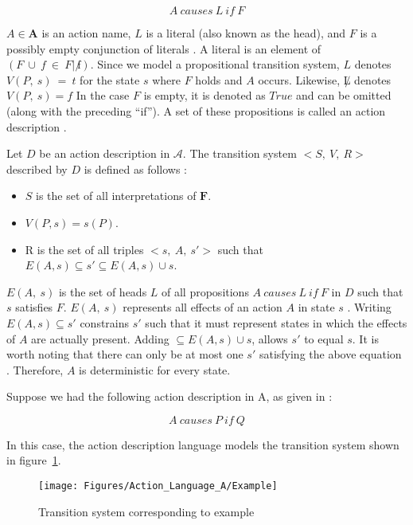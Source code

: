 $$
A\ causes\ L\ if\ F
$$

$ A \in \boldsymbol{A} $ is an action name, $ L $ is a literal (also known as the head), and $ F $ is a possibly empty conjunction of literals \cite{gelfond_action_1998}.
A literal is an element of $(F\ \cup\ {f\ \in\ F |\ \not f})$.
Since we model a propositional transition system, $L$ denotes $V(P,\ s)\ =\ t$ for the state $s$ where $F$ holds and $A$ occurs.
Likewise, $\not L$ denotes $V(P,\ s)=f$
In the case $ F $ is empty, it is denoted as $ True $ and can be omitted (along with the preceding ``if'').
A set of these propositions is called an action description \cite{gelfond_action_1998}.

\begin{definition}
    Let $ D $ be an action description in $ \mathcal{A} $.
    The transition system $ <S,\ V,\ R> $ described by $ D $ is defined as follows \cite{gelfond_action_1998}:

    \begin{itemize}
        \item $ S $ is the set of all interpretations of $ \boldsymbol{F} $.
        \item $ V(P, s) = s(P) $.
        \item R is the set of all triples $ <s,\ A,\ s'> $ such that $ E(A,s) \subseteq s' \subseteq E(A,s) \cup s $.
    \end{itemize}
\end{definition}

$ E(A,\ s) $ is the set of heads $ L $ of all propositions $ A\ causes\ L\ if\ F $ in $ D $ such that $ s $ satisfies $ F $.
$ E(A,\ s) $ represents all effects of an action $ A $ in state $ s $ \cite{gelfond_action_1998}.
Writing $ E\left(A,s\right)\subseteq s' $ constrains $ s' $ such that it must represent states in which the effects of $ A $ are actually present.
Adding $ \subseteq E\left(A,s\right)\cup s $, allows $ s' $ to equal $ s $.
It is worth noting that there can only be at most one $ s' $ satisfying the above equation \cite{gelfond_action_1998}.
Therefore, $ A $ is deterministic for every state.

Suppose we had the following action description in A, as given in \cite{gelfond_action_1998}:

$$
A\ causes\ P\ if\ Q
$$

In this case, the action description language models the transition system shown in figure~\ref{fig:action_language_a_example}.

\begin{figure}[h]
    \centering
    \texttt{[image: Figures/Action\_Language\_A/Example]}
    \caption{Transition system corresponding to example}
    \label{fig:action_language_a_example}
\end{figure}


